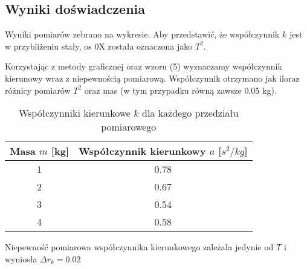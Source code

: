 \documentclass{article} %
\begin{document}
\subsection{Wyniki doświadczenia}
Wyniki pomiarów zebrano na wykresie. Aby przedstawić, że współczynnik $k$ jest w przybliżeniu stały, os 0X została oznaczona jako $T^2$. 
\begin{center}

\end{center}
Korzystając z metody graficznej oraz wzoru (5) wyznaczamy współczynnik kierunowy wraz z niepewnością pomiarową. Współczynnik otrzymano jak iloraz różnicy pomiarów $T^2$ oraz mas (w tym przypadku równą zawsze 0.05 kg).
\begin{center}
    \begin{table}[h!]
\centering

\label{tab:coefficients}

\begin{tabular}{|c|c|}
\hline
\textbf{Masa \( m \) [kg]} & \textbf{Współczynnik kierunkowy \( a \) [$s^2/kg$]} \\ 
\hline
1 & 0.78 \\ 
2 & 0.67\\ 
3 & 0.54 \\ 
4 & 0.58 \\
\hline
\end{tabular}
\caption{Współczynniki kierunkowe \( k \) dla każdego przedziału pomiarowego}
\end{table}
\end{center}
Niepewność pomiarowa współczynnika kierunkowego zależała jedynie od $T$ i wyniosła $\Delta r_k = 0.02$
\end{document}

